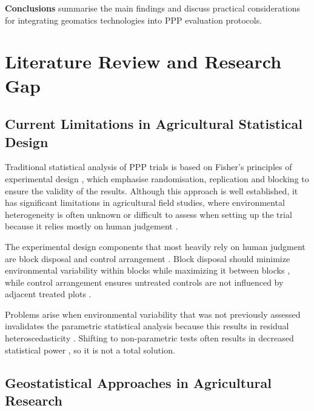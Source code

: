 \documentclass[12pt,a4paper,oneside]{report}
\begin{document}
\textbf{Conclusions} summarise the main findings and discuss practical 
considerations for integrating geomatics technologies into PPP evaluation 
protocols.

\section{Literature Review and Research Gap}

\subsection{Current Limitations in Agricultural Statistical Design}

Traditional statistical analysis of PPP trials is based on Fisher's principles of experimental design \cite{fisherStatisticalMethodsResearch1992,meadStatisticalPrinciplesDesign2012,caslerFundamentalsExperimentalDesign2015}, which emphasise randomisation, replication and blocking to ensure the validity of the results. Although this approach is well established, it has significant limitations in agricultural field studies, where environmental heterogeneity is often unknown or difficult to assess when setting up the trial because it relies mostly on human judgement \cite{paroliniPursuitScienceAgriculture2015,berryResistedRiseRandomisation2015}.

The experimental design components that most heavily rely on human judgment are block disposal and control arrangement \cite{tocherDesignAnalysisBlock1952,williamsOptimalityContrastsBlock2015}. Block disposal should minimize environmental variability within blocks while maximizing it between blocks \cite{vanesSpatialNatureRandomization1993,brienMultiphaseExperimentsLeast2011}, while control arrangement ensures untreated controls are not influenced by adjacent treated plots \cite{piephoWhyRandomizeAgricultural2013}.

Problems arise when environmental variability that was not previously assessed invalidates the parametric statistical analysis because this results in residual heteroscedasticity \cite{schabenbergerStatisticalMethodsSpatial2004,onofriNewMethodAnalysis2010}. Shifting to non-parametric tests often results in decreased statistical power \cite{stroupRethinkingAnalysisNonNormal2015,agrestiIntroductionCategoricalData2018}, so it is not a total solution.

\subsection{Geostatistical Approaches in Agricultural Research}
\end{document}
